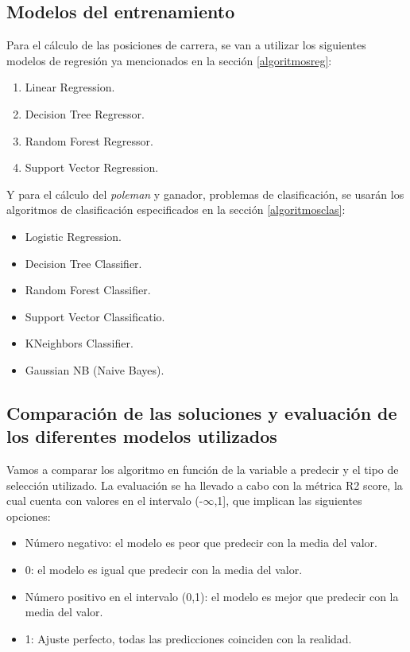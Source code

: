 \subsection{Modelos del entrenamiento}

Para el cálculo de las posiciones de carrera, se van a utilizar los siguientes modelos de regresión ya mencionados en la sección \ref{algoritmosreg}:

\begin{enumerate}
    \item Linear Regression.
    \item Decision Tree Regressor.
    \item Random Forest Regressor.
    \item Support Vector Regression.
\end{enumerate}

Y para el cálculo del \textit{poleman} y ganador, problemas de clasificación, se usarán los algoritmos de clasificación especificados en la sección \ref{algoritmosclas}: 

\begin{itemize}
    \item Logistic Regression.
    \item Decision Tree Classifier.
    \item Random Forest Classifier.
    \item Support Vector Classificatio.
    \item KNeighbors Classifier.
    \item Gaussian NB (Naive Bayes).
\end{itemize}

\subsection{Comparación de las soluciones y evaluación de los diferentes modelos utilizados}

Vamos a comparar los algoritmo en función de la variable a predecir y el tipo de selección utilizado. La evaluación se ha llevado a cabo con la métrica R2 score, la cual cuenta con valores en el intervalo (-$\infty$,1], que implican las siguientes opciones:
\begin{itemize}
    \item Número negativo: el modelo es peor que predecir con la media del valor.
    \item 0: el modelo es igual que predecir con la media del valor.
    \item Número positivo en el intervalo (0,1): el modelo es mejor que predecir con la media del valor.
    \item 1: Ajuste perfecto, todas las predicciones coinciden con la realidad.
\end{itemize}

